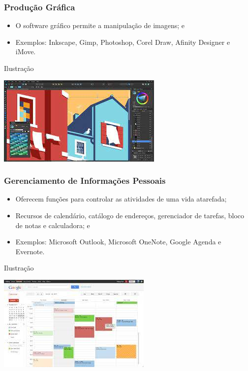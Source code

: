 \documentclass[aspectratio=169]{beamer} %
\begin{document}
\begin{frame}
	\frametitle{Produ\c cão Gráfica}
		
	\begin{itemize}
		\item O software gráfico permite a manipulação de imagens; e
		\item  Exemplos: Inkscape, Gimp, Photoshop, Corel Draw, Afinity Designer e iMove.
	\end{itemize}\vfill
	
	\begin{exampleblock}{Ilustra\c cão}
		\begin{center}
			\includegraphics[scale=0.4]{img/afinity}
		\end{center}
	\end{exampleblock}
\end{frame}

\begin{frame}
	\frametitle{Gerenciamento de Informações Pessoais}
		
	\begin{itemize}
		\item Oferecem funções para controlar as atividades de uma vida atarefada;
		\item Recursos de calendário, catálogo de endereços, gerenciador de tarefas, bloco de notas e calculadora; e
		\item Exemplos:  Microsoft Outlook, Microsoft OneNote, Google Agenda e Evernote.
	\end{itemize}\vfill
	
	\begin{exampleblock}{Ilustra\c cão}
		\begin{center}
			\includegraphics[scale=0.4]{img/agenda}
		\end{center}	
	\end{exampleblock}
\end{frame}
\end{document}
